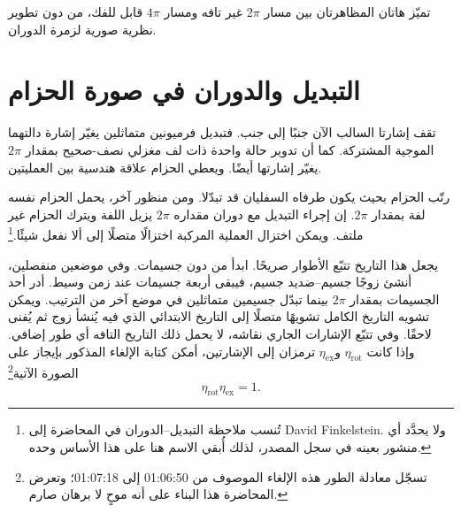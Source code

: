 \begin{classroomqa}
\end{classroomqa}

تميّز هاتان المظاهرتان بين مسار \(2\pi\) غير تافه ومسار \(4\pi\) قابل للفك، من دون تطوير نظرية صورية لزمرة الدوران.

\section{التبديل والدوران في صورة الحزام}

تقف إشارتا السالب الآن جنبًا إلى جنب. فتبديل فرميونين متماثلين يغيّر إشارة دالتهما الموجية المشتركة. كما أن تدوير حالة واحدة ذات لف مغزلي نصف-صحيح بمقدار \(2\pi\) يغيّر إشارتها أيضًا. ويعطي الحزام علاقة هندسية بين العمليتين.

رتّب الحزام بحيث يكون طرفاه السفليان قد تبدّلا. ومن منظور آخر، يحمل الحزام نفسه لفة بمقدار \(2\pi\). إن إجراء التبديل مع دوران مقداره \(2\pi\) يزيل اللفة ويترك الحزام غير ملتف. ويمكن اختزال العملية المركبة اختزالًا متصلًا إلى ألا نفعل شيئًا.\footnote{تُنسب ملاحظة التبديل--الدوران في المحاضرة إلى David Finkelstein. ولا يحدَّد أي منشور بعينه في سجل المصدر، لذلك أُبقي الاسم هنا على هذا الأساس وحده.}

\begin{classroomqa}
\end{classroomqa}

يجعل هذا التاريخ تتبّع الأطوار صريحًا. ابدأ من دون جسيمات. وفي موضعين منفصلين، أنشئ زوجًا جسيم--ضديد جسيم، فيبقى أربعة جسيمات عند زمن وسيط. أدر أحد الجسيمات بمقدار \(2\pi\) بينما تبدّل جسيمين متماثلين في موضع آخر من الترتيب. ويمكن تشويه التاريخ الكامل تشويهًا متصلًا إلى التاريخ الابتدائي الذي فيه يُنشأ زوج ثم يُفنى لاحقًا. وفي تتبّع الإشارات الجاري نقاشه، لا يحمل ذلك التاريخ التافه أي طور إضافي. وإذا كانت \(\eta_{\mathrm{rot}}\) و\(\eta_{\mathrm{ex}}\) ترمزان إلى الإشارتين، أمكن كتابة الإلغاء المذكور بإيجاز على الصورة الآتية\footnote{تسجّل معادلة الطور هذه الإلغاء الموصوف من 01:06:50 إلى 01:07:18؛ وتعرض المحاضرة هذا البناء على أنه موحٍ لا برهان صارم.}
\begin{equation}
\eta_{\mathrm{rot}}\eta_{\mathrm{ex}}=1.
\end{equation}

